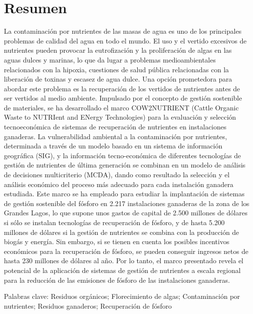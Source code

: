 \newpage

\section*{Resumen}
La contaminación por nutrientes de las masas de agua es uno de los principales problemas de calidad del agua en todo el mundo. El uso y el vertido excesivos de nutrientes pueden provocar la eutrofización y la proliferación de algas en las aguas dulces y marinas, lo que da lugar a problemas medioambientales relacionados con la hipoxia, cuestiones de salud pública relacionadas con la liberación de toxinas y escasez de agua dulce. Una opción prometedora para abordar este problema es la recuperación de los vertidos de nutrientes antes de ser vertidos al medio ambiente. Impulsado por el concepto de gestión sostenible de materiales, se ha desarrollado el marco COW2NUTRIENT (Cattle Organic Waste to NUTRIent and ENergy Technologies) para la evaluación y selección tecnoeconómica de sistemas de recuperación de nutrientes en instalaciones ganaderas. La vulnerabilidad ambiental a la contaminación por nutrientes, determinada a través de un modelo basado en un sistema de información geográfica (SIG), y la información tecno-económica de diferentes tecnologías de gestión de nutrientes de última generación se combinan en un modelo de análisis de decisiones multicriterio (MCDA), dando como resultado la selección y el análisis económico del proceso más adecuado para cada instalación ganadera estudiada. Este marco se ha empleado para estudiar la implantación de sistemas de gestión sostenible del fósforo en 2.217 instalaciones ganaderas de la zona de los Grandes Lagos, lo que supone unos gastos de capital de 2.500 millones de dólares si sólo se instalan tecnologías de recuperación de fósforo, y de hasta 5.200 millones de dólares si la gestión de nutrientes se combina con la producción de biogás y energía. Sin embargo, si se tienen en cuenta los posibles incentivos económicos para la recuperación de fósforo, se pueden conseguir ingresos netos de hasta 230 millones de dólares al año. Por lo tanto, el marco presentado revela el potencial de la aplicación de sistemas de gestión de nutrientes a escala regional para la reducción de las emisiones de fósforo de las instalaciones ganaderas.

\bigskip
Palabras clave: Residuos orgánicos; Florecimiento de algas; Contaminación por nutrientes; Residuos ganaderos; Recuperación de fósforo

\newpage

